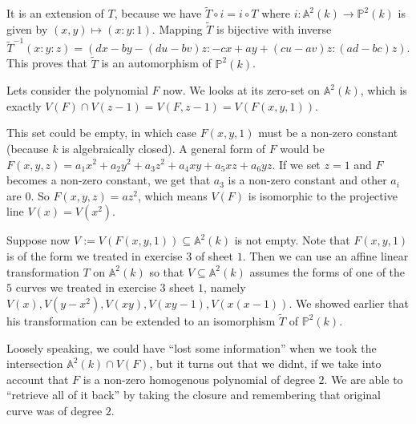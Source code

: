 \begin{exercise}{2}
\begin{enumerate}
\begin{equation*}
            \end{equation*}
            It is an extension of $T$, because we have $\widetilde{T} \circ i =
            i \circ T$ where $i \colon \mathbb{A}^2(k) \rightarrow
            \mathbb{P}^2(k)$ is given by $(x, y) \mapsto (x : y : 1)$.
            Mapping $\widetilde{T}$ is bijective with inverse
            \[
                \widetilde{T}^{-1}(x : y : z) = ( dx - by - (du - bv) z : - cx +
                ay + (cu - av)z : (ad - bc)z).
            \]
            This proves that $\widetilde{T}$ is an automorphism of
            $\mathbb{P}^2(k)$.

            Lets consider the polynomial $F$ now. We looks at its zero-set on
            $\mathbb{A}^2(k)$, which is exactly $V(F) \cap V(z - 1) = V(F, z - 1) = V(F(x, y, 1))$.

            This set could be empty, in which case $F(x, y, 1)$ must be a
            non-zero constant (because $k$ is algebraically closed). A general
            form of $F$ would be $F(x, y, z) = a_1 x^2 + a_2 y^2 + a_3 z^2 + a_4
            xy + a_5 xz + a_6 yz$. If we set $z = 1$ and $F$ becomes a non-zero
            constant, we get that $a_3$ is a non-zero constant and other $a_i$
            are $0$. So $F(x, y, z) = a z^2$, which means $V(F)$ is isomorphic
            to the projective line $V(x) = V(x^2)$.

            Suppose now $V := V(F(x, y, 1)) \subseteq \mathbb{A}^2(k)$ is not
            empty. Note that $F(x, y, 1)$ is of the form we treated in exercise
            $3$ of sheet $1$. Then we can use an affine linear transformation
            $T$ on $\mathbb{A}^2(k)$ so that $V \subseteq \mathbb{A}^2(k)$
            assumes the forms of one of the $5$ curves we treated in exercise
            $3$ sheet $1$, namely $V(x), V(y - x^2), V(xy), V(xy - 1), V(x(x -
            1))$. We showed earlier that his transformation can be extended to
            an isomorphism $\widetilde{T}$ of $\mathbb{P}^2(k)$.

            Loosely speaking, we could have ``lost some information'' when we
            took the intersection $\mathbb{A}^2(k) \cap V(F)$, but it turns out
            that we didnt, if we take into account that $F$ is a non-zero
            homogenous polynomial of degree $2$. We are able to ``retrieve all
            of it back'' by taking the closure and remembering that original
            curve was of degree $2$.


\end{enumerate}
\end{exercise}
